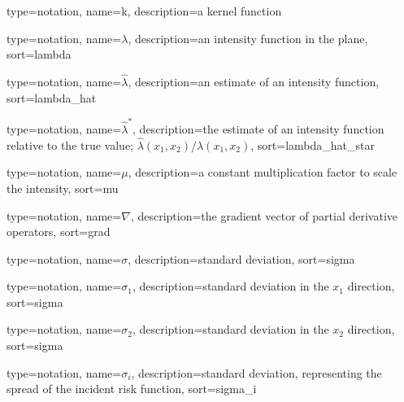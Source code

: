 


{%
   type=notation,
   name={k},
   description={a kernel function}
}

{%
   type=notation,
   name={\ensuremath{\lambda}},
   description={an intensity function in the plane},
   sort={lambda}
}

{%
   type=notation,
   name={\ensuremath{\hat{\lambda}}},
   description={an estimate of an intensity function},
   sort={lambda_hat}
}

{%
   type=notation,
   name={\ensuremath{\hat{\lambda}^*}},
   description={the estimate of an intensity function relative to the true value; \ensuremath{\hat{\lambda}(x_1, x_2)/\lambda(x_1, x_2)}},
   sort={lambda_hat_star}
}

{%
   type=notation,
   name={\ensuremath{\mu}},
   description={a constant multiplication factor to scale the intensity},
   sort={mu}
}

{%
   type=notation,
   name={\ensuremath{\nabla}},
   description={the gradient vector of partial derivative operators},
   sort={grad}
}

{%
   type=notation,
   name={\ensuremath{\sigma}},
   description={standard deviation},
   sort={sigma}
}

{%
   type=notation,
   name={\ensuremath{\sigma_1}},
   description={standard deviation in the \ensuremath{x_1} direction},
   sort={sigma}
}

{%
   type=notation,
   name={\ensuremath{\sigma_2}},
   description={standard deviation in the \ensuremath{x_2} direction},
   sort={sigma}
}

{%
   type=notation,
   name={\ensuremath{\sigma_i}},
   description={standard deviation, representing the spread of the incident risk function},
   sort={sigma_i}
}

